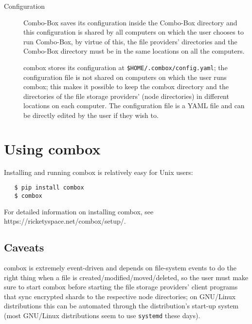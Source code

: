 \begin{description}
\item[Configuration] Combo-Box saves its configuration inside the
  Combo-Box directory and this configuration is shared by all
  computers on which the user chooses to run Combo-Box, by virtue of
  this, the file providers' directories and the Combo-Box directory
  must be in the same locations on all the computers.

  combox stores its configuration at
  \verb+$HOME/.combox/config.yaml+; the configuration file is not
  shared on computers on which the user runs combox; this makes it
  possible to keep the combox directory and the directories of the
  file storage providers' (node directories) in different locations on
  each computer. The configuration file is a YAML file and can be
  directly edited by the user if they wish to.
\end{description}

\section{Using combox}\label{1-sec-using-cb}

Installing and running combox is relatively easy for Unix users:

\begin{verbatim}
   $ pip install combox
   $ combox
\end{verbatim}

For detailed information on installing combox, see
https://ricketyspace.net/combox/setup/.

\subsection{Caveats}

combox is extremely event-driven and depends on file-system events to
do the right thing when a file is created/modified/moved/deleted, so
the user must make sure to start combox before starting the file
storage providers' client programs that sync encrypted shards to the
respective node directories; on GNU/Linux distributions this can be
automated through the distribution's start-up system (most GNU/Linux
distributions seem to use \verb+systemd+\cite{website:systemd} these
days).
